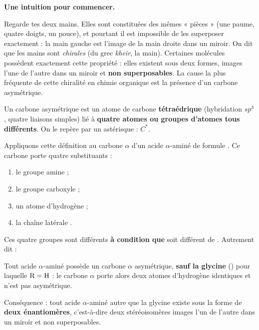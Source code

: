 \documentclass[11pt]{article}
\newcommand{\cle}[1]{{\popxbold\color{popdark}#1}}
\newcounter{popsec}
\newcounter{popsub}
\newcommand{\courssub}[1]{%
  \stepcounter{popsub}%
  \par\vspace{9pt}\noindent{\popxbold\fontsize{11.5}{13}\selectfont\color{popink}{\color{poporange}\thepopsec.\thepopsub}\hspace{6pt}#1}\par\nopagebreak\vspace{4pt}
}
\begin{document}
\courssub{Le carbone asymétrique}

\textbf{Une intuition pour commencer.}\par
Regarde tes deux mains. Elles sont constituées des mêmes « pièces » (une paume, quatre doigts, un pouce), et pourtant il est impossible de les superposer exactement : la main gauche est l'image de la main droite dans un miroir. On dit que les mains sont \emph{chirales} (du grec \emph{kheir}, la main). Certaines molécules possèdent exactement cette propriété : elles existent sous deux formes, images l'une de l'autre dans un miroir et \textbf{non superposables}. La cause la plus fréquente de cette chiralité en chimie organique est la présence d'un \cle{carbone asymétrique}.

\begin{definition}
Un \cle{carbone asymétrique} est un atome de carbone \textbf{tétraédrique} (hybridation $sp^3$, quatre liaisons simples) lié à \textbf{quatre atomes ou groupes d'atomes tous différents}. On le repère par un astérisque : $C^*$.
\end{definition}

Appliquons cette définition au carbone $\alpha$ d'un acide $\alpha$-aminé de formule . Ce carbone porte quatre substituants :
\begin{enumerate}
\item le groupe amine  ;
\item le groupe carboxyle  ;
\item un atome d'hydrogène  ;
\item la chaîne latérale .
\end{enumerate}
Ces quatre groupes sont différents \textbf{à condition que}  soit différent de . Autrement dit :

\begin{propriete}
Tout acide $\alpha$-aminé possède un carbone $\alpha$ asymétrique, \textbf{sauf la glycine} () pour laquelle $\ce{R} = \ce{H}$ : le carbone $\alpha$ porte alors deux atomes d'hydrogène identiques et n'est pas asymétrique.
\par\smallskip
Conséquence : tout acide $\alpha$-aminé autre que la glycine existe sous la forme de \textbf{deux énantiomères}, c'est-à-dire deux stéréoisomères images l'un de l'autre dans un miroir et non superposables.
\end{propriete}
\end{document}
